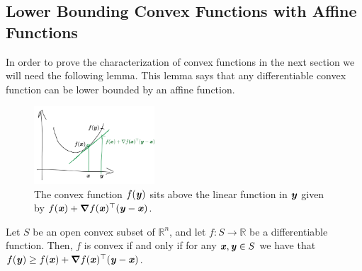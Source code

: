 

\subsection{Lower Bounding Convex Functions with Affine Functions}
In order to prove the characterization of convex functions in the next
section we will need the following lemma.  This lemma says that any
differentiable convex function can be lower bounded by an affine function.


\begin{figure}[h]
  \centering
  \includegraphics[width=0.4\textwidth]{fig/lecture2_convex-linear-lb.png}
\caption{The convex function $f(\boldsymbol{\mathit{y}})$ sits above the linear function
  in $\boldsymbol{\mathit{y}}$ given by
  ${f(\boldsymbol{\mathit{x}}) + \boldsymbol{\nabla} f(\boldsymbol{\mathit{x}})^\top  (\boldsymbol{\mathit{y}}-\boldsymbol{\mathit{x}})}$.}
\label{fig:nonjointconvex}
\end{figure}
%

\begin{theorem}\label{thm:convexlb}
Let  $S$ be an open convex subset of $\mathbb{R}^n$, and
let $f:S\to \mathbb{R}$ be a  differentiable function.
Then, $f$ is convex if and only if for any $\boldsymbol{\mathit{x}},\boldsymbol{\mathit{y}} \in S$ we have that $f(\boldsymbol{\mathit{y}}) \geq f(\boldsymbol{\mathit{x}}) + \boldsymbol{\nabla} f(\boldsymbol{\mathit{x}})^\top  (\boldsymbol{\mathit{y}}-\boldsymbol{\mathit{x}})$.
\end{theorem}

